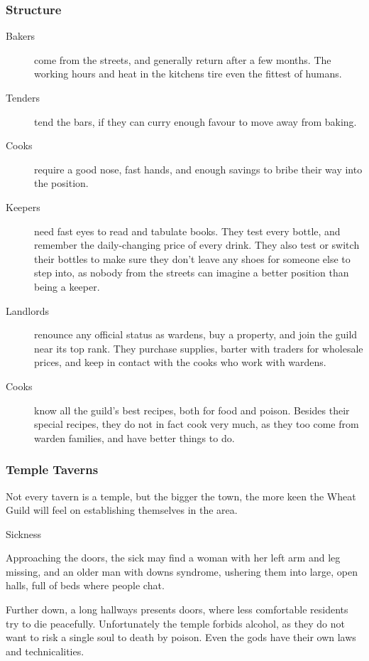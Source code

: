 \begin{multicols}{2}
\subsubsection{Structure}

\begin{description}
  \item[Bakers]
  come from the streets, and generally return after a few months.
  The working hours and heat in the kitchens tire even the fittest of humans.
  \item[Tenders]
  tend the bars, if they can curry enough favour to move away from baking.
  \item[Cooks]
  require a good nose, fast hands, and enough savings to bribe their way into the position.
  \item[Keepers]
  need fast eyes to read and tabulate books.
  They test every bottle, and remember the daily-changing price of every drink.
  They also test or switch their bottles to make sure they don't leave any shoes for someone else to step into, as nobody from the streets can imagine a better position than being a keeper.
  \item[Landlords]
  renounce any official status as wardens, buy a property, and join the guild near its top rank.
  They purchase supplies, barter with traders for wholesale prices, and keep in contact with the cooks who work with wardens.
  \item[Cooks]
  know all the guild's best recipes, both for food and poison.
  Besides their special recipes, they do not in fact cook very much, as they too come from warden families, and have better things to do.
\end{description}

\subsubsection{Temple Taverns}

Not every tavern is a temple, but the bigger the town, the more keen the Wheat Guild will feel on establishing themselves in the area.

  {\decotwo}%
  {Sickness}%
  {
    Approaching the doors, the sick may find a woman with her left arm and leg missing, and an older man with downs syndrome, ushering them into large, open halls, full of beds where people chat.

    Further down, a long hallways presents doors, where less comfortable residents try to die peacefully.
    Unfortunately the temple forbids alcohol, as they do not want to risk a single soul to death by poison.
    Even the gods have their own laws and technicalities.

}
\end{multicols}
